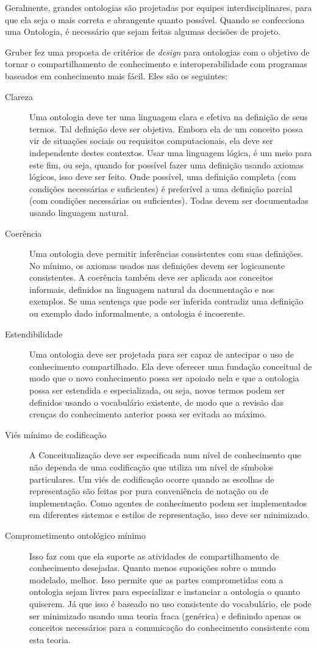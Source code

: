 Geralmente, grandes ontologias são projetadas por equipes interdisciplinares, para que ela seja o mais correta e abrangente quanto possível. Quando se confecciona uma Ontologia, é necessário que sejam feitas algumas decisões de projeto.  

Gruber \cite{ontoGruber} fez uma proposta de critérios de \textit{design} para ontologias com o objetivo de tornar o compartilhamento de conhecimento e interoperabilidade com programas baseados em conhecimento mais fácil. Eles são os seguintes:

\begin{description}
	\item[Clareza] Uma ontologia deve ter uma linguagem clara e efetiva na definição de seus termos. Tal definição deve ser objetiva. Embora ela de um conceito possa vir de situações sociais ou requisitos computacionais, ela deve ser independente destes contextos. Usar uma linguagem lógica, é um meio para este fim, ou seja, quando for possível fazer uma definição usando axiomas lógicos, isso deve ser feito. Onde possível, uma definição completa (com condições necessárias e suficientes) é preferível a uma definição parcial (com condições necessárias ou suficientes). Todas devem ser documentadas usando linguagem natural.
	\item[Coerência] Uma ontologia deve permitir inferências consistentes com suas definições. No mínimo, os axiomas usados nas definições devem ser logicamente consistentes. A coerência também deve ser aplicada aos conceitos informais, definidos na linguagem natural da documentação e nos exemplos. Se uma sentença que pode ser inferida contradiz uma definição ou exemplo dado informalmente, a ontologia é incoerente.
	\item[Estendibilidade] Uma ontologia deve ser projetada para ser capaz de antecipar o uso de conhecimento compartilhado. Ela deve oferecer uma fundação conceitual de modo que o novo conhecimento possa ser apoiado nela e que a ontologia possa ser estendida e especializada, ou seja, novos termos podem ser definidos usando o vocabulário existente, de modo que a revisão das crenças do conhecimento anterior possa ser evitada ao máximo.
	\item[Viés mínimo de codificação] A Conceitualização deve ser especificada num nível de conhecimento que não dependa de uma codificação que utiliza um nível de símbolos particulares. Um viés de codificação ocorre quando as escolhas de representação são feitas por pura conveniência de notação ou de implementação. Como agentes de conhecimento podem ser implementados em diferentes sistemas e estilos de representação, isso deve ser minimizado.
	\item[Comprometimento ontológico mínimo] Isso faz com que ela suporte as atividades de compartilhamento de conhecimento desejadas. Quanto menos suposições sobre o mundo modelado, melhor. Isso permite que as partes comprometidas com a ontologia sejam livres para especializar e instanciar a ontologia o quanto quiserem. Já que isso é baseado no uso consistente do vocabulário, ele pode ser minimizado usando uma teoria fraca (genérica) e definindo apenas os conceitos necessários para a comunicação do conhecimento consistente com esta teoria.
\end{description}

